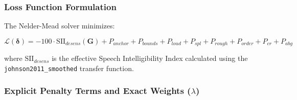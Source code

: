 \documentclass[
]{article}
\begin{document}
\subsubsection{Loss Function
Formulation}\label{loss-function-formulation}

The Nelder-Mead solver minimizes:

\begin{equation}
\mathcal{L}(\boldsymbol{\delta}) = -100 \cdot \text{SII}_{desens}(\mathbf{G}) + P_{anchor} + P_{bounds} + P_{loud} + P_{spl} + P_{rough} + P_{order} + P_{cr} + P_{abg}
\end{equation}

where \(\text{SII}_{desens}\) is the effective Speech Intelligibility
Index calculated using the \texttt{johnson2011\_smoothed} transfer
function.

\subsubsection{\texorpdfstring{Explicit Penalty Terms and Exact Weights
(\(\lambda\))}{Explicit Penalty Terms and Exact Weights (\textbackslash lambda)}}\label{explicit-penalty-terms-and-exact-weights-lambda}
\end{document}
